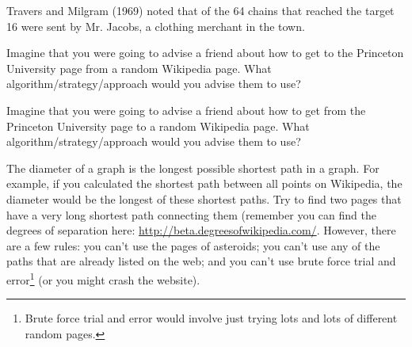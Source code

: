\documentclass[addpoints]{exam}
\begin{document}
\begin{questions}
\question Travers and Milgram (1969) noted that of the 64 chains that reached the target 16 were sent by Mr. Jacobs, a clothing merchant in the town.  
\vspace{1in}

\question[6] Imagine that you were going to advise a friend about how to get to the Princeton University page from a random Wikipedia page.  What algorithm/strategy/approach would you advise them to use? 

\vspace{2in}

\question[6] Imagine that you were going to advise a friend about how to get from the Princeton University page to a random Wikipedia page.  What algorithm/strategy/approach would you advise them to use? 

\vspace{2in}

\question The diameter of a graph is the longest possible shortest path in a graph.  For example, if you calculated the shortest path between all points on Wikipedia, the diameter would be the longest of these shortest paths.  Try to find two pages that have a very long shortest path connecting them (remember you can find the degrees of separation here: \url{http://beta.degreesofwikipedia.com/}.  However, there are a few rules: you can't use the pages of asteroids; you can't use any of the paths that are already listed on the web; and you can't use brute force trial and error\footnote{Brute force trial and error would involve just trying lots and lots of different random pages.} (or you might crash the website).  



\end{questions}
\end{document}
